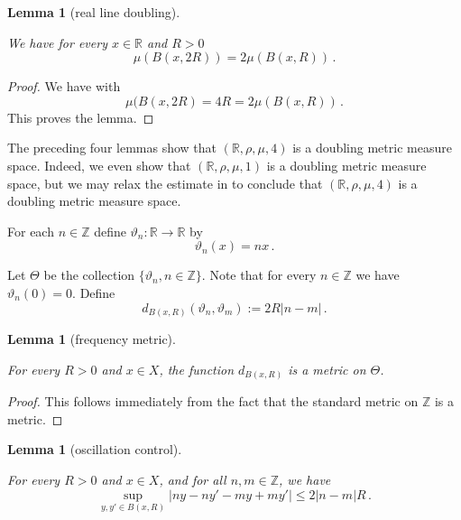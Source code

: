 \documentclass[10pt,a4paper]{article}
\theoremstyle{plain}
\newtheorem{lemma}[theorem]{Lemma}
\theoremstyle{definition}
\numberwithin{equation}{subsection}
\newcommand{\R}{{\mathbb{R}}}
\newcommand{\mfa}{{\vartheta}}
\newcommand{\Mf}{{\Theta}}
\newcommand{\lean}[1]{}
\newcommand{\uses}[1]{}
\newcommand{\leanok}{}
\begin{document}
\begin{lemma}[real line doubling]
\label{real-line-doubling}
\leanok
\lean{MeasureTheory.InnerProductSpace.IsDoubling}
\uses{real-line-ball-measure}
    We have for every $x\in \R$ and $R>0$
    \begin{equation}
        \mu(B(x,2R))=2\mu(B(x,R))\, .
    \end{equation}
\end{lemma}
\begin{proof}
    \leanok
    We have with 
\begin{equation}
    \mu(B(x,2R)=4R=2\mu(B(x,R))\, .
\end{equation}
This proves the lemma.
\end{proof}


The preceding four lemmas show that $(\R, \rho, \mu, 4)$ is a doubling metric measure space. Indeed, we even show
that $(\R, \rho, \mu, 1)$ is a doubling metric measure space, but we may relax the estimate in  to conclude that $(\R, \rho, \mu, 4)$
is a doubling metric measure space.


For each $n\in \mathbb{Z}$ define
$\mfa_n:\R\to \R$ by
\begin{equation}
    \mfa_n(x)=nx\, .
\end{equation}


Let $\Mf$ be the collection $\{\mfa_n, n\in \mathbb{Z}\}$.
Note that for every $n\in \mathbb{Z}$ we have $\mfa_n(0)=0$.
Define
\begin{equation}
    \label{eqcarl4}
    d_{B(x,R)}(\mfa_n, \mfa_m) := 2R|n-m|\,.
\end{equation}

\begin{lemma}[frequency metric]
    \label{frequency-metric}
    \leanok
    \lean{instFunctionDistancesReal}
    For every $R > 0$ and $x \in X$, the function $d_{B(x,R)}$ is a metric on $\Mf$.
\end{lemma}

\begin{proof}
    \leanok
    This follows immediately from the fact that the standard metric on $\mathbb{Z}$ is a metric.
\end{proof}

\begin{lemma}[oscillation control]
\label{oscillation-control}
\leanok
\lean{oscillation_control}
    For every $R > 0$ and $x \in X$, and for all $n, m \in \mathbb{Z}$, we have
    \begin{equation}\label{eqcarl2}
       \sup_{y,y'\in B(x,R)}|ny-ny'-my+my'|\le 2|n-m|R\, .
    \end{equation}
\end{lemma}
\end{document}
